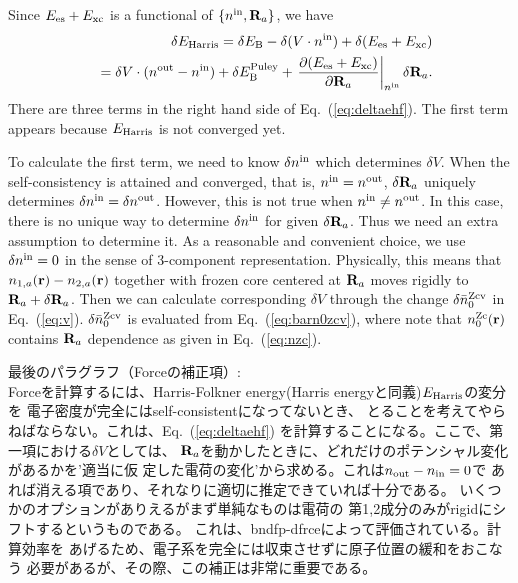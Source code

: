 \documentclass[twocolumn,showpacs,preprintnumbers,amsmath,amssymb,floatfix]{revtex4-1}
\newcommand{\bfr}{{\bf r}}
\newcommand{\bfR}{{\bf R}}
\newcommand{\req}[1]{\mbox{Eq.~\!(\ref{#1})}}
\def\nzc{n^{\rm Zc}}
\def\barnzcv{\bar{n}^{\rm Zcv}}
\def\ehf{E_{\rm Harris}}
\def\nin{n^{\rm in}}
\def\nout{n^{\rm out}}
\def\Vin{V}
\def\nzc{n^{\rm Zc}}
\def\barnzcv{\bar{n}^{\rm Zcv}}
\def\ehf{E_{\rm Harris}}
\def\nin{n^{\rm in}}
\def\nout{n^{\rm out}}
\def\Vin{V}
\begin{document}
\begin{widetext}
Since $E_{\rm es} + E_{\rm xc}$ is a functional of $\{\nin,\bfR_a\}$, we have
\begin{eqnarray}
&&\delta \ehf = \delta E_{\rm B} - \delta (\Vin \cdot \nin) 
  + \delta (E_{\rm es} + E_{\rm xc}) \nonumber \\
&&= \delta \Vin \cdot (\nout- \nin) 
  + \delta E_{\rm B}^{\rm Puley} 
  + \left.\frac{\partial (E_{\rm es} + E_{\rm xc})}{\partial \bfR_a}\right|_{\nin} \delta \bfR_a.
\label{eq:deltaehf} 
\end{eqnarray}
There are three terms in the right hand side of \req{eq:deltaehf}.
The first term appears because $\ehf$ is not converged yet.

To calculate the first term, we need to know $\delta \nin$ which determines
$\delta \Vin$. When the self-consistency is attained and converged,
that is, $\nin=\nout$, $\delta \bfR_a$ uniquely determines
$\delta \nin=\delta \nout$.
However, this is not true when $\nin \ne \nout$.
In this case, there is no unique way to determine $\delta \nin$
for given $\delta \bfR_a$. Thus we need an extra assumption to
determine it. As a reasonable and convenient choice,
we use $\delta \nin=0$ in the sense of 3-component representation. 
Physically, this means that $n_{1,a}(\bfr)-n_{2,a}(\bfr)$  
together with frozen core centered at $\bfR_a$
moves rigidly to $\bfR_a+\delta\bfR_a$.
Then we can calculate corresponding $\delta \Vin$ through the change
$\delta \barnzcv_0$ in \req{eq:v}. $\delta \barnzcv_0$ is evaluated from
\req{eq:barn0zcv},
where note that $\nzc_0(\bfr)$ contains $\bfR_a$ dependence as
given in \req{eq:nzc}.

最後のパラグラフ（Forceの補正項）:\\
Forceを計算するには、Harris-Folkner energy(Harris energyと同義)$E_{\rm Harris}$の変分を
電子密度が完全にはself-consistentになってないとき、
とることを考えてやらねばならない。これは、\req{eq:deltaehf} 
を計算することになる。ここで、第一項における$\delta V$としては、
$\bfR_a$を動かしたときに、どれだけのポテンシャル変化があるかを'適当に仮
定した電荷の変化'から求める。これは$n_{\rm out}-n_{\rm in}=0$で
あれば消える項であり、それなりに適切に推定できていれば十分である。
いくつかのオプションがありえるがまず単純なものは電荷の
第1,2成分のみがrigidにシフトするというものである。
これは、bndfp-dfrceによって評価されている。計算効率を
あげるため、電子系を完全には収束させずに原子位置の緩和をおこなう
必要があるが、その際、この補正は非常に重要である。


\end{widetext}
\end{document}
